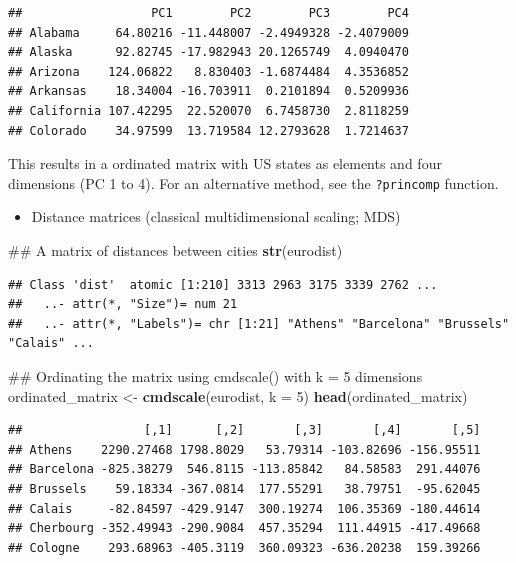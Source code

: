 \documentclass[]{book}
\newenvironment{Shaded}{\begin{snugshade}}{\end{snugshade}}
\newcommand{\KeywordTok}[1]{\textcolor[rgb]{0.13,0.29,0.53}{\textbf{#1}}}
\newcommand{\DataTypeTok}[1]{\textcolor[rgb]{0.13,0.29,0.53}{#1}}
\newcommand{\DecValTok}[1]{\textcolor[rgb]{0.00,0.00,0.81}{#1}}
\newcommand{\StringTok}[1]{\textcolor[rgb]{0.31,0.60,0.02}{#1}}
\newcommand{\NormalTok}[1]{#1}
\providecommand{\tightlist}{%
  \setlength{\itemsep}{0pt}\setlength{\parskip}{0pt}}
\theoremstyle{definition}
\theoremstyle{definition}
\theoremstyle{remark}
\begin{document}
\begin{verbatim}
##                  PC1        PC2        PC3        PC4
## Alabama     64.80216 -11.448007 -2.4949328 -2.4079009
## Alaska      92.82745 -17.982943 20.1265749  4.0940470
## Arizona    124.06822   8.830403 -1.6874484  4.3536852
## Arkansas    18.34004 -16.703911  0.2101894  0.5209936
## California 107.42295  22.520070  6.7458730  2.8118259
## Colorado    34.97599  13.719584 12.2793628  1.7214637
\end{verbatim}

This results in a ordinated matrix with US states as elements and four
dimensions (PC 1 to 4). For an alternative method, see the
\texttt{?princomp} function.

\begin{itemize}
\tightlist
\item
  Distance matrices (classical multidimensional scaling; MDS)
\end{itemize}

\begin{Shaded}
\begin{Highlighting}[]
\NormalTok{## A matrix of distances between cities}
\KeywordTok{str}\NormalTok{(eurodist)}
\end{Highlighting}
\end{Shaded}

\begin{verbatim}
## Class 'dist'  atomic [1:210] 3313 2963 3175 3339 2762 ...
##   ..- attr(*, "Size")= num 21
##   ..- attr(*, "Labels")= chr [1:21] "Athens" "Barcelona" "Brussels" "Calais" ...
\end{verbatim}

\begin{Shaded}
\begin{Highlighting}[]
\NormalTok{## Ordinating the matrix using cmdscale() with k = 5 dimensions }
\NormalTok{ordinated_matrix <-}\StringTok{ }\KeywordTok{cmdscale}\NormalTok{(eurodist, }\DataTypeTok{k =} \DecValTok{5}\NormalTok{)}
\KeywordTok{head}\NormalTok{(ordinated_matrix)}
\end{Highlighting}
\end{Shaded}

\begin{verbatim}
##                 [,1]      [,2]       [,3]       [,4]       [,5]
## Athens    2290.27468 1798.8029   53.79314 -103.82696 -156.95511
## Barcelona -825.38279  546.8115 -113.85842   84.58583  291.44076
## Brussels    59.18334 -367.0814  177.55291   38.79751  -95.62045
## Calais     -82.84597 -429.9147  300.19274  106.35369 -180.44614
## Cherbourg -352.49943 -290.9084  457.35294  111.44915 -417.49668
## Cologne    293.68963 -405.3119  360.09323 -636.20238  159.39266
\end{verbatim}
\end{document}
